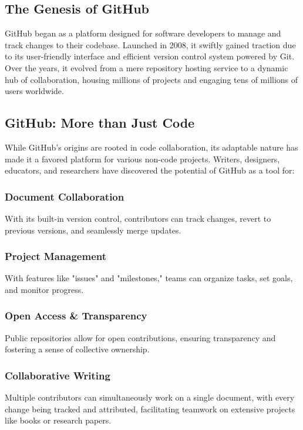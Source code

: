 \documentclass[a4paper,12pt]{book}
\begin{document}
\subsection*{The Genesis of GitHub}
GitHub began as a platform designed for software developers to manage and track changes to their codebase. Launched in 2008, it swiftly gained traction due to its user-friendly interface and efficient version control system powered by Git. Over the years, it evolved from a mere repository hosting service to a dynamic hub of collaboration, housing millions of projects and engaging tens of millions of users worldwide.

\subsection*{GitHub: More than Just Code}
While GitHub's origins are rooted in code collaboration, its adaptable nature has made it a favored platform for various non-code projects. Writers, designers, educators, and researchers have discovered the potential of GitHub as a tool for:

\subsubsection*{Document Collaboration}
With its built-in version control, contributors can track changes, revert to previous versions, and seamlessly merge updates.

\subsubsection*{Project Management}
With features like "issues" and "milestones," teams can organize tasks, set goals, and monitor progress.

\subsubsection*{Open Access \& Transparency}
Public repositories allow for open contributions, ensuring transparency and fostering a sense of collective ownership.

\subsubsection*{Collaborative Writing}
Multiple contributors can simultaneously work on a single document, with every change being tracked and attributed, facilitating teamwork on extensive projects like books or research papers.
\end{document}
